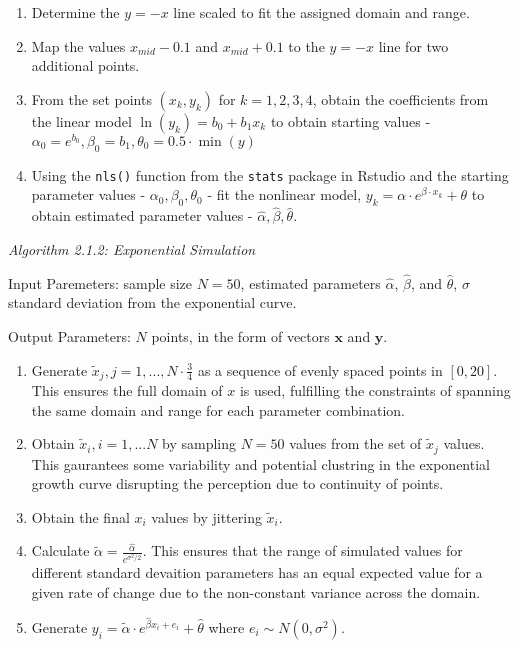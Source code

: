 \documentclass[print]{nuthesis}
\begin{document}
\begin{enumerate}
\def\labelenumi{\arabic{enumi}.}
\item
  Determine the \(y=-x\) line scaled to fit the assigned domain and range.
\item
  Map the values \(x_{mid} - 0.1\) and \(x_{mid} + 0.1\) to the \(y=-x\) line for two additional points.
\item
  From the set points \((x_k, y_k)\) for \(k = 1,2,3,4\), obtain the coefficients from the linear model \(\ln(y_k) = b_0 +b_1x_k\) to obtain starting values - \(\alpha_0 = e^{b_0}, \beta_0 = b_1, \theta_0 = 0.5\cdot \min(y)\)
\item
  Using the \texttt{nls()} function from the \texttt{stats} package in Rstudio and the starting parameter values - \(\alpha_0, \beta_0, \theta_0\) - fit the nonlinear model, \(y_k = \alpha\cdot e^{\beta\cdot x_k}+\theta\) to obtain estimated parameter values - \(\hat\alpha, \hat\beta, \hat\theta.\)
\end{enumerate}

\noindent\textit{Algorithm 2.1.2: Exponential Simulation}

Input Paremeters: sample size \(N = 50\), estimated parameters \(\hat\alpha\), \(\hat\beta\), and \(\hat\theta\), \(\sigma\) standard deviation from the exponential curve.

Output Parameters: \(N\) points, in the form of vectors \(\mathbf{x}\) and \(\mathbf{y}\).

\begin{enumerate}
\def\labelenumi{\arabic{enumi}.}
\item
  Generate \(\tilde x_j, j = 1,..., N\cdot \frac{3}{4}\) as a sequence of evenly spaced points in \([0,20]\). This ensures the full domain of \(x\) is used, fulfilling the constraints of spanning the same domain and range for each parameter combination.
\item
  Obtain \(\tilde x_i, i = 1,...N\) by sampling \(N = 50\) values from the set of \(\tilde x_j\) values. This gaurantees some variability and potential clustring in the exponential growth curve disrupting the perception due to continuity of points.
\item
  Obtain the final \(x_i\) values by jittering \(\tilde x_i\).
\item
  Calculate \(\tilde\alpha = \frac{\hat\alpha}{e^{\sigma^2/2}}.\) This ensures that the range of simulated values for different standard devaition parameters has an equal expected value for a given rate of change due to the non-constant variance across the domain.
\item
  Generate \(y_i = \tilde\alpha\cdot e^{\hat\beta x_i + e_i}+\hat\theta\) where \(e_i\sim N(0,\sigma^2).\)
\end{enumerate}
\end{document}
